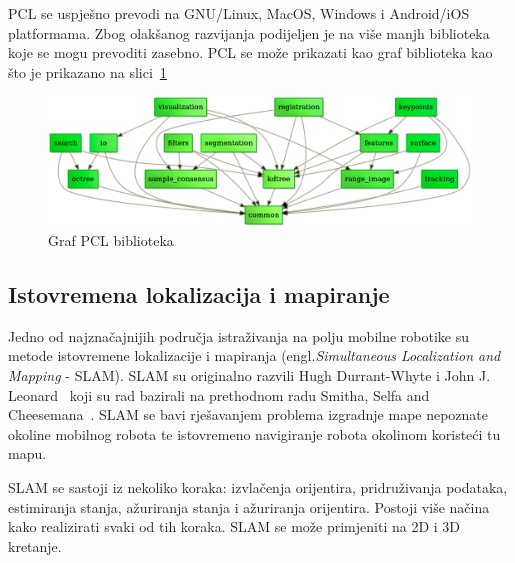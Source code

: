 PCL se uspješno prevodi na GNU/Linux, MacOS, Windows i Android/iOS
platformama. Zbog olakšanog razvijanja podijeljen je na više manjh
biblioteka koje se mogu prevoditi zasebno. PCL se može prikazati kao
graf biblioteka kao što je prikazano na slici~\ref{fig:pcl-graph.png}

\setcounter{figure}{0}
\begin{figure}[h]
\renewcommand{\figurename}{Grafikon}
\centering
\includegraphics[scale=0.40]{figures/pcl-graph.png}
\caption{Graf PCL biblioteka}
\label{fig:pcl-graph.png}
\end{figure}



\newpage
\subsection{Istovremena lokalizacija i mapiranje} %
\label{sub:Slam}
Jedno od najznačajnijih područja istraživanja na polju mobilne robotike
su metode istovremene lokalizacije i mapiranja
(engl.\textit{Simultaneous Localization and Mapping} - SLAM). SLAM su
originalno razvili Hugh Durrant-Whyte i John J.
Leonard~\cite{Durrant:91b} koji su rad bazirali na prethodnom radu
Smitha, Selfa and Cheesemana~\cite{Smith86}. SLAM se bavi rješavanjem
problema izgradnje mape nepoznate okoline mobilnog robota te istovremeno
navigiranje robota okolinom koristeći tu mapu.

SLAM se sastoji iz nekoliko koraka: izvlačenja orijentira, pridruživanja
podataka, estimiranja stanja, ažuriranja stanja i ažuriranja orijentira.
Postoji više načina kako realizirati svaki od tih koraka. SLAM se može
primjeniti na 2D i 3D kretanje.


